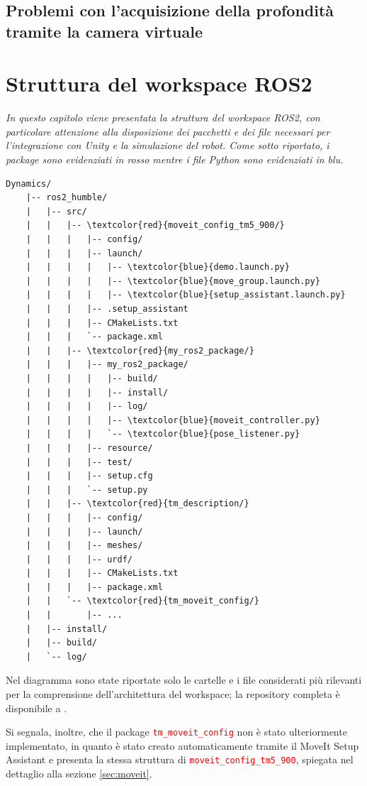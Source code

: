 \documentclass[11pt]{report}
\begin{document}
\section{Problemi con l'acquisizione della profondità tramite la camera virtuale}
\label{sec:Problemi_camera_virtuale}
\chapter{Struttura del workspace ROS2}
\textit{In questo capitolo viene presentata la struttura del workspace ROS2, con particolare attenzione alla disposizione dei pacchetti e dei file necessari per l'integrazione con Unity e la simulazione del robot. Come sotto riportato, i package sono evidenziati in rosso mentre i file Python sono evidenziati in blu.}

\begin{Verbatim}[commandchars=\\\{\}]
Dynamics/
    |-- ros2_humble/
    |   |-- src/
    |   |   |-- \textcolor{red}{moveit_config_tm5_900/}
    |   |   |   |-- config/
    |   |   |   |-- launch/
    |   |   |   |   |-- \textcolor{blue}{demo.launch.py}
    |   |   |   |   |-- \textcolor{blue}{move_group.launch.py}
    |   |   |   |   |-- \textcolor{blue}{setup_assistant.launch.py}
    |   |   |   |-- .setup_assistant
    |   |   |   |-- CMakeLists.txt
    |   |   |   `-- package.xml
    |   |   |-- \textcolor{red}{my_ros2_package/}
    |   |   |   |-- my_ros2_package/
    |   |   |   |   |-- build/
    |   |   |   |   |-- install/ 
    |   |   |   |   |-- log/
    |   |   |   |   |-- \textcolor{blue}{moveit_controller.py}
    |   |   |   |   `-- \textcolor{blue}{pose_listener.py}  
    |   |   |   |-- resource/
    |   |   |   |-- test/
    |   |   |   |-- setup.cfg
    |   |   |   `-- setup.py
    |   |   |-- \textcolor{red}{tm_description/}
    |   |   |   |-- config/
    |   |   |   |-- launch/  
    |   |   |   |-- meshes/
    |   |   |   |-- urdf/
    |   |   |   |-- CMakeLists.txt
    |   |   |   |-- package.xml
    |   |   `-- \textcolor{red}{tm_moveit_config/}
    |   |       |-- ...
    |   |-- install/
    |   |-- build/
    |   `-- log/
\end{Verbatim}

\newpage

Nel diagramma sono state riportate solo le cartelle e i file considerati più rilevanti per la comprensione dell'architettura del workspace; la repository completa è disponibile a \cite{Repository_ROS2}.

Si segnala, inoltre, che il package \textcolor{red}{\texttt{tm\_moveit\_config}} non è stato ulteriormente implementato, in quanto è stato creato automaticamente tramite il MoveIt Setup Assistant e presenta la stessa struttura di \textcolor{red}{\texttt{moveit\_config\_tm5\_900}}, spiegata nel dettaglio alla sezione \ref{sec:moveit}.
\end{document}

